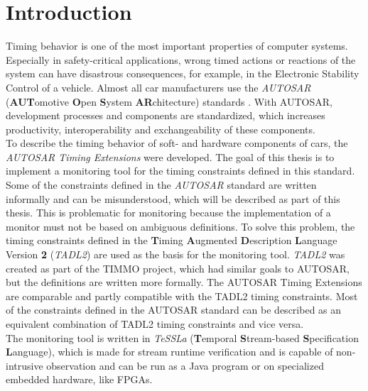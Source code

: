 
\chapter{Introduction}

	Timing behavior is one of the most important properties of computer systems. Especially in safety-critical applications, wrong timed actions or reactions of the system can have disastrous consequences, for example, in the Electronic Stability Control of a vehicle. Almost all car manufacturers use the \emph{AUTOSAR} (\textbf{AUT}omotive \textbf{O}pen \textbf{S}ystem \textbf{AR}chitecture) standards \cite{AUTOSARpartner}. With AUTOSAR, development processes and components are standardized, which increases productivity, interoperability and exchangeability of these components.\\
	To describe the timing behavior of soft- and hardware components of cars, the \emph{AUTOSAR Timing Extensions} were developed. The goal of this thesis is to implement a monitoring tool for the timing constraints defined in this standard.\\
	Some of the constraints defined in the \emph{AUTOSAR} standard are written informally and can be misunderstood, which will be described as part of this thesis. This is problematic for monitoring because the implementation of a monitor must not be based on ambiguous definitions. To solve this problem, the timing constraints defined in the \textbf{T}iming \textbf{A}ugmented \textbf{D}escription \textbf{L}anguage Version \textbf{2} (\textit{TADL2})\cite{TIMMO2USE} are used as the basis for the monitoring tool. \emph{TADL2} was created as part of the TIMMO project, which had similar goals to AUTOSAR, but the definitions are written more formally. The AUTOSAR Timing Extensions are comparable and partly compatible with the TADL2 timing constraints. Most of the constraints defined in the AUTOSAR standard can be described as an equivalent combination of TADL2 timing constraints and vice versa.\\
	The monitoring tool is written in \emph{TeSSLa} (\textbf{T}emporal \textbf{S}tream-based \textbf{S}pecification \textbf{L}anguage), which is made for stream runtime verification and is capable of non-intrusive observation and can be run as a Java program or on specialized embedded hardware, like FPGAs.


